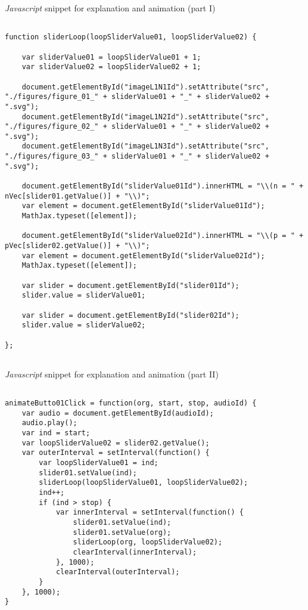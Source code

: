 \documentclass{article}
\begin{document}
\begin{CodeSnippet}[!hp]
	\centering
	\caption{\emph{Javascript} snippet for explanation and animation (part I)}
\vspace{0.25cm}	
	\begin{BVerbatim}
		
function sliderLoop(loopSliderValue01, loopSliderValue02) {
	
	var sliderValue01 = loopSliderValue01 + 1;
	var sliderValue02 = loopSliderValue02 + 1;
	
	document.getElementById("imageL1N1Id").setAttribute("src", "./figures/figure_01_" + sliderValue01 + "_" + sliderValue02 + ".svg");
	document.getElementById("imageL1N2Id").setAttribute("src", "./figures/figure_02_" + sliderValue01 + "_" + sliderValue02 + ".svg");
	document.getElementById("imageL1N3Id").setAttribute("src", "./figures/figure_03_" + sliderValue01 + "_" + sliderValue02 + ".svg");
	
	document.getElementById("sliderValue01Id").innerHTML = "\\(n = " + nVec[slider01.getValue()] + "\\)";
	var element = document.getElementById("sliderValue01Id");
	MathJax.typeset([element]);
	
	document.getElementById("sliderValue02Id").innerHTML = "\\(p = " + pVec[slider02.getValue()] + "\\)";
	var element = document.getElementById("sliderValue02Id");
	MathJax.typeset([element]);
	
	var slider = document.getElementById("slider01Id");
	slider.value = sliderValue01;
	
	var slider = document.getElementById("slider02Id");
	slider.value = sliderValue02;
	
};
		
	\end{BVerbatim}
	\vspace*{-2mm}
	\label{JsCodSniAn01}
\end{CodeSnippet}

\begin{CodeSnippet}[!hp]
	\centering
	\caption{\emph{Javascript} snippet for explanation and animation (part II)}
\vspace{0.25cm}	
	\begin{BVerbatim}
		
animateButto01Click = function(org, start, stop, audioId) {
	var audio = document.getElementById(audioId);
	audio.play();
	var ind = start;
	var loopSliderValue02 = slider02.getValue();
	var outerInterval = setInterval(function() {
		var loopSliderValue01 = ind;
		slider01.setValue(ind);
		sliderLoop(loopSliderValue01, loopSliderValue02);
		ind++;
		if (ind > stop) {
			var innerInterval = setInterval(function() {
				slider01.setValue(ind);
				slider01.setValue(org);
				sliderLoop(org, loopSliderValue02);
				clearInterval(innerInterval);
			}, 1000);
			clearInterval(outerInterval);
		}
	}, 1000);
}
		
	\end{BVerbatim}
	\vspace*{-2mm}
	\label{JsCodSniAn02}
\end{CodeSnippet}
\end{document}
